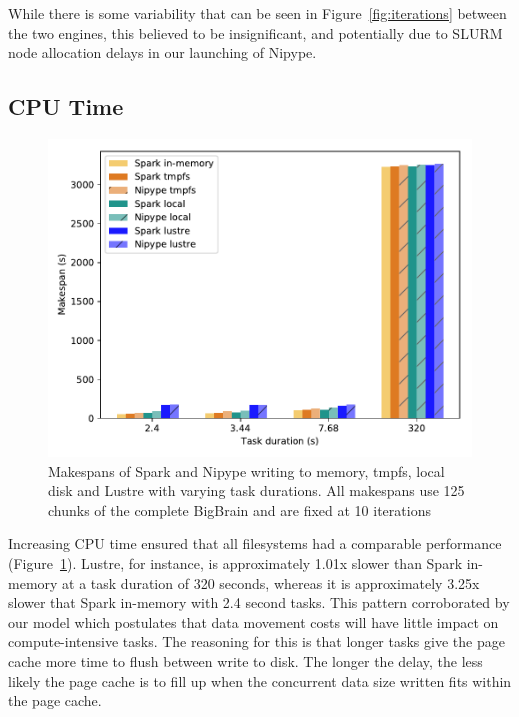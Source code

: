 \documentclass{IEEEtran}
\begin{document}
While there is some variability that can be seen in Figure~\ref{fig:iterations} 
between the two engines, this believed to be insignificant, and potentially due 
to SLURM node allocation delays in our launching of Nipype.


\subsection{CPU Time}
%
\begin{figure}[h]
    \centering
    \includegraphics[width=\linewidth]{results/figures/cputime.pdf}
    \caption{Makespans of Spark and Nipype writing to memory, tmpfs, local 
             disk and Lustre with varying task durations. All 
             makespans use 125 chunks of the complete BigBrain and are fixed at 
             10 iterations}\label{fig:cputime}
\end{figure}

Increasing CPU time ensured that all filesystems had a comparable performance
(Figure~\ref{fig:cputime}). Lustre, for instance, is approximately 1.01x slower
than Spark in-memory at a task duration of 320 seconds, whereas it is 
approximately 3.25x slower that Spark in-memory with 2.4 second tasks. This 
pattern corroborated by our model which postulates that 
data movement costs will have little impact on compute-intensive tasks. The 
reasoning for this is that longer tasks give the page cache more time to flush 
between write to disk. The longer the delay, the less likely the page cache is 
to fill up when the concurrent data size written fits within the page cache.
\end{document}
